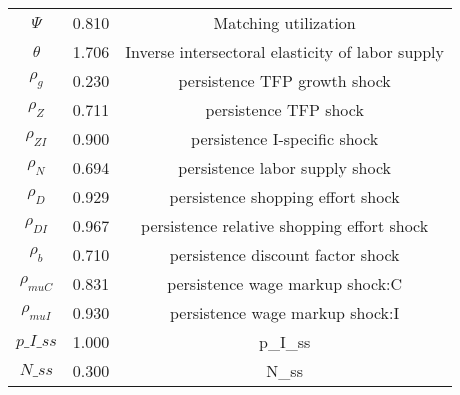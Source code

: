 \begin{center}
\begin{longtable}{ccc}
${\Psi}$ 	 & 	 0.810 	 & 	 Matching utilization\\
${\theta}$ 	 & 	 1.706 	 & 	 Inverse intersectoral elasticity of labor supply\\
${\rho_g}$ 	 & 	 0.230 	 & 	 persistence TFP growth shock\\
${\rho_Z}$ 	 & 	 0.711 	 & 	 persistence TFP shock\\
${\rho_{ZI}}$ 	 & 	 0.900 	 & 	 persistence I-specific shock\\
${\rho_N}$ 	 & 	 0.694 	 & 	 persistence labor supply shock\\
${\rho_D}$ 	 & 	 0.929 	 & 	 persistence shopping effort shock\\
${\rho_{DI}}$ 	 & 	 0.967 	 & 	 persistence relative shopping effort shock\\
${\rho_b}$ 	 & 	 0.710 	 & 	 persistence discount factor shock\\
${\rho_{muC}}$ 	 & 	 0.831 	 & 	 persistence wage markup shock:C\\
${\rho_{muI}}$ 	 & 	 0.930 	 & 	 persistence wage markup shock:I\\
$p\_I\_ss$ 	 & 	 1.000 	 & 	 p\_I\_ss\\
$N\_ss$ 	 & 	 0.300 	 & 	 N\_ss\\
\bottomrule%
\end{longtable}
\end{center}

